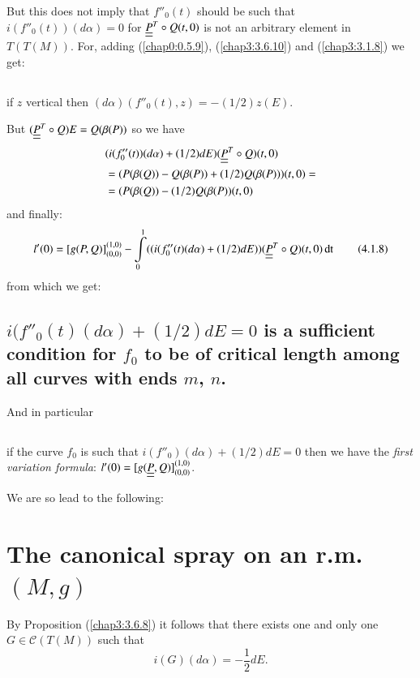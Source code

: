 But this does not imply that $f''_{0}(t)$ should be such that
$i(f''_{0}(t))(d\alpha)=0$ for $\underline{\underline{P}}^{T}\circ Q(t,0)$ is not an
arbitrary element in $T(T(M))$. For, adding (\ref{chap0:0.5.9}),
(\ref{chap3:3.6.10}) and (\ref{chap3:3.1.8}) we get:

\subsection{}\label{chap4:4.1.7}\pageoriginale
if $z$ vertical then $(d\alpha)(f''_{0}(t),z)=-(1/2)z(E)$.

But $(\underline{\underline{P}}^{T}\circ Q)E=Q(\beta(P))$ so we have
\begin{align*}
&(i(f''_{0}(t))(d\alpha)+(1/2)dE)(\underline{\underline{P}}^{T}\circ Q)(t,0)\\ 
&=(P(\beta(Q))-Q(\beta(P))+(1/2)Q(\beta(P)))(t,0)=\\
&=(P(\beta(Q))-(1/2)Q(\beta(P))(t,0)
\end{align*}
and finally:
\begin{equation*}
l'(0)=[g(P,Q)]^{(1,0)}_{(0,0)}-\int\limits^{1}_{0}((i(f''_{0}(t)(d\alpha)+(1/2)dE))(\underline{\underline{P}}^{T}\circ
Q)(t,0)\operatorname{dt}\tag{4.1.8}\label{chap4:4.1.8} 
\end{equation*}
from which we get:

\setcounter{subsection}{8}
\subsection{$i(f''_{0}(t)(d\alpha)+(1/2)dE=0$ is a sufficient
  condition for $f_{0}$ to be of critical length among all curves with
ends $m$, $n$.}\label{chap4:4.1.9}

And in particular

\subsection{}\label{chap4:4.1.10}
if the curve $f_{0}$ is such that $i(f''_{0})(d\alpha)+(1/2)dE=0$ then
we have the {\em first variation formula}:
$l'(0)=[g(\underline{\underline{P}},Q)]^{(1,0)}_{(0,0)}$.

We are so lead to the following:

\section{The canonical spray on an r.m.\@ $(M,g)$}\label{chap4:chap4-sec2}

By Proposition (\ref{chap3:3.6.8}) it follows that there exists one and
only one $G\in\mathscr{C}(T(M))$ such that
\begin{equation*}
i(G)(d\alpha)=-\frac{1}{2}dE.\tag{4.2.1}\label{chap4:4.2.1}
\end{equation*}

